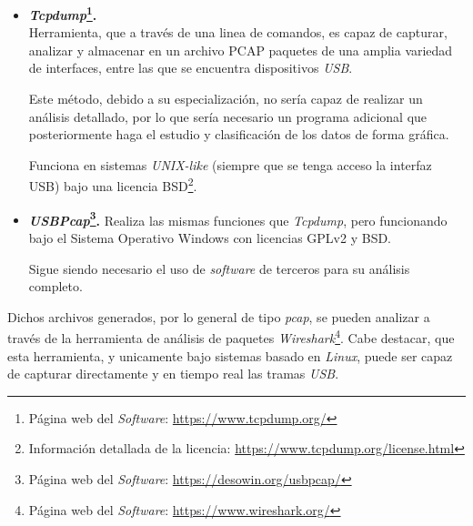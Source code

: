 \begin{itemize}
    \item \textbf{\emph{Tcpdump}\footnote{Página web del \emph{Software}: \url{https://www.tcpdump.org/}}.} \\
    Herramienta, que a través de una linea de comandos, es capaz de capturar, analizar y almacenar en un archivo PCAP paquetes de una amplia variedad de interfaces, entre las que se encuentra dispositivos \emph{USB}.

    Este método, debido a su especialización, no sería capaz de realizar un análisis detallado, por lo que sería necesario un programa adicional que posteriormente haga el estudio y clasificación de los datos de forma gráfica.

    Funciona en sistemas \emph{UNIX-like} (siempre que se tenga acceso la interfaz USB) bajo una licencia BSD\footnote{Información detallada de la licencia: \url{https://www.tcpdump.org/license.html}}.
    
    \item \textbf{\emph{USBPcap}\footnote{Página web del \emph{Software}: \url{https://desowin.org/usbpcap/}}.}
    Realiza las mismas funciones que \emph{Tcpdump}, pero funcionando bajo el Sistema Operativo Windows con licencias GPLv2 y BSD.
    
    Sigue siendo necesario el uso de \emph{software} de terceros para su análisis completo.
\end{itemize}

Dichos archivos generados, por lo general de tipo \emph{pcap}\cite{guyharris2015}, se pueden analizar a través de la herramienta de análisis de paquetes \emph{Wireshark}\footnote{Página web del \emph{Software}: \url{https://www.wireshark.org/}}. Cabe destacar, que esta herramienta, y unicamente bajo sistemas basado en \emph{Linux}, puede ser capaz de capturar directamente y en tiempo real las tramas \emph{USB}. 




